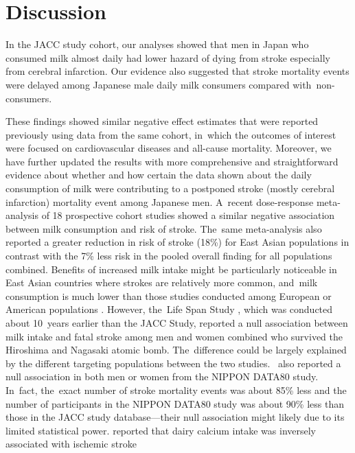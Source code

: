 \documentclass[nutrients,article,accept,moreauthors,pdftex]{Definitions/mdpi}
\begin{document}
\hypertarget{discussion}{%
\section{Discussion}\label{discussion}}

In the JACC study cohort, our analyses showed that men in Japan who
consumed milk almost daily had lower hazard of dying from stroke
especially from cerebral infarction. Our evidence also suggested that
stroke mortality events were delayed among Japanese male daily milk
consumers compared with~non-consumers.

These findings showed similar negative effect estimates that were
reported previously \citep{wang_milk_2015} using data from the same
cohort, in~which the outcomes of interest were focused on
cardiovascular diseases and all-cause mortality. Moreover, we have
further updated the results with more comprehensive and straightforward
evidence about whether and how certain the data shown about the daily
consumption of milk were contributing to a postponed stroke (mostly
cerebral infarction) mortality event among Japanese men. A~recent
dose-response meta-analysis of 18 prospective cohort studies showed a
similar negative association \citep{DeGoede2016} between milk
consumption and risk of stroke. The~same meta-analysis also reported a
greater reduction in risk of stroke (18\%) for East Asian populations in
contrast with the 7\% less risk in the pooled overall finding for all
populations combined. Benefits of increased milk intake might be
particularly noticeable in East Asian countries where strokes are
relatively more common, and~milk consumption is much lower than those
studies conducted among European or American populations
\citep{dehghan2018association}. However, the~Life Span Study
\citep{sauvaget2003intake}, which was conducted about 10~years earlier
than the JACC Study, reported a null association between milk intake and
fatal stroke among men and women combined who survived the
Hiroshima and Nagasaki atomic bomb. The~difference could be largely
explained by the different targeting populations between the two
\mbox{studies.~\citet{kondo2013consumption}} also reported a null association in
both men or women from the NIPPON DATA80 study. In~fact, the~exact
number of stroke mortality events was about 85\% less and the number of
participants in the NIPPON DATA80 study was about 90\% less than those in the
JACC study database---their null association might likely due to its
limited statistical power. \citet{umesawa2008dietary} reported that
dairy calcium intake was inversely associated with ischemic stroke
\end{document}
